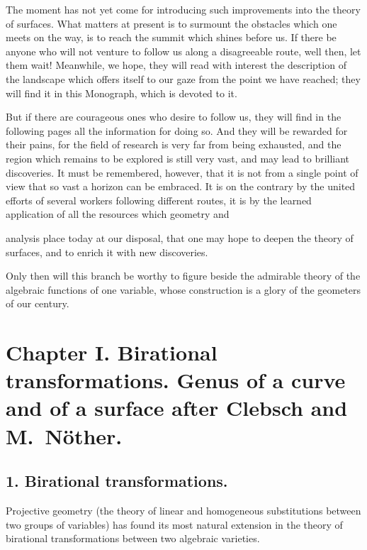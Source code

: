 \documentclass{article}
\begin{document}
The moment has not yet come for introducing such improvements into the theory of surfaces. What matters at present is to surmount the obstacles which one meets on the way, is to reach the summit which shines before us. If there be anyone who will not venture to follow us along a disagreeable route, well then, let them wait! Meanwhile, we hope, they will read with interest the description of the landscape which offers itself to our gaze from the point we have reached; they will find it in this Monograph, which is devoted to it.

But if there are courageous ones who desire to follow us, they will find in the following pages all the information for doing so. And they will be rewarded for their pains, for the field of research is very far from being exhausted, and the region which remains to be explored is still very vast, and may lead to brilliant discoveries. It must be remembered, however, that it is not from a single point of view that so vast a horizon can be embraced. It is on the contrary by the united efforts of several workers following different routes, it is by the learned application of all the resources which geometry and

analysis place today at our disposal, that one may hope to deepen the theory of surfaces, and to enrich it with new discoveries.

Only then will this branch be worthy to figure beside the admirable theory of the algebraic functions of one variable, whose construction is a glory of the geometers of our century.

\section*{Chapter I. Birational transformations. Genus of a curve and of a surface after Clebsch and M.\ Nöther.}

\subsection*{1. Birational transformations.}

Projective geometry (the theory of linear and homogeneous substitutions between two groups of variables) has found its most natural extension in the theory of birational transformations between two algebraic varieties.
\end{document}
